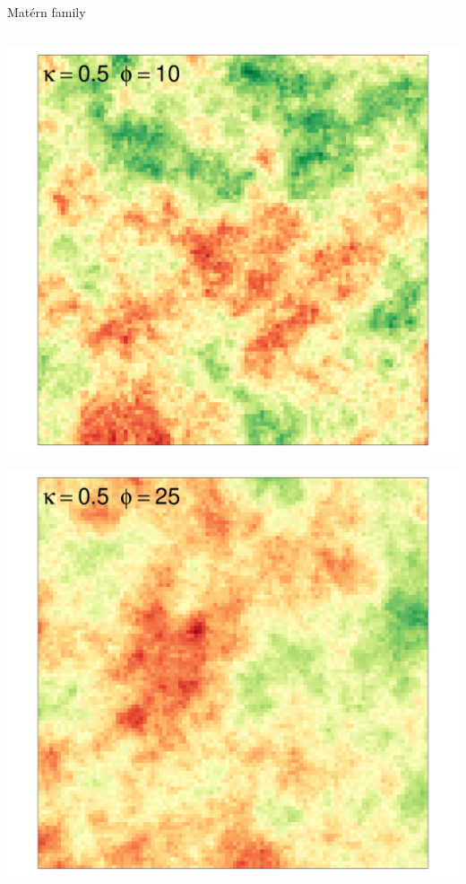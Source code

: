 \documentclass[
  ignorenonframetext,
]{beamer}
\begin{document}
\begin{frame}{Matérn family}
\begin{columns}[T]
\begin{column}{0.33\textwidth}
\includegraphics{Lecture_1_files/figure-beamer/unnamed-chunk-29-1.pdf}

\includegraphics{Lecture_1_files/figure-beamer/unnamed-chunk-30-1.pdf}
\end{column}


\end{columns}
\end{frame}
\end{document}
